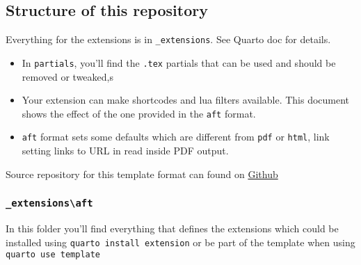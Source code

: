\documentclass[
]{aft}
\begin{document}
\hypertarget{structure-of-this-repository}{%
\subsection{Structure of this
repository}\label{structure-of-this-repository}}

Everything for the extensions is in \texttt{\_extensions}. See Quarto
doc for details.

\begin{itemize}
\item
  In \texttt{partials}, you'll find the \texttt{.tex} partials that can
  be used and should be removed or tweaked,s
\item
  Your extension can make shortcodes and lua filters available. This
  document shows the effect of the one provided in the \texttt{aft}
  format.
\item
  \texttt{aft} format sets some defaults which are different from
  \texttt{pdf} or \texttt{html}, link setting links to URL in read
  inside PDF output.
\end{itemize}

Source repository for this template format can found on
\href{https://github.com/quarto-journals/article-format-template}{Github}

\hypertarget{extensionsaft}{%
\subsubsection{\texorpdfstring{\texttt{\_extensions\textbackslash{}aft}}{\_extensions\textbackslash aft}}\label{extensionsaft}}

In this folder you'll find everything that defines the extensions which
could be installed using \texttt{quarto\ install\ extension} or be part
of the template when using \texttt{quarto\ use\ template}
\end{document}
